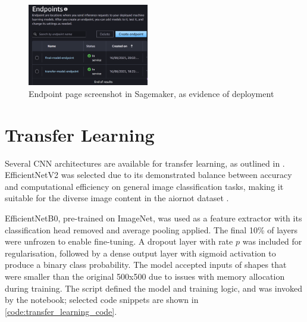 \begin{figure}[h]
    \centering
    \includegraphics[width=200px]{figures/endpoints_screenshot.png} %
    \centering
    \caption{Endpoint page screenshot in Sagemaker, as evidence of deployment} %
    \label{fig:endpoint} %
\end{figure}

\begin{figure}[h]
        
\end{figure}

\newpage

\section{Transfer Learning} \label{sec:transfer_learning}

Several CNN architectures are available for transfer learning, as outlined in \cite{keras_applications}. EfficientNetV2 was selected due to its demonstrated balance between accuracy and computational efficiency on general image classification tasks, making it suitable for the diverse image content in the aiornot dataset \cite{keras_applications, tan2021efficientnetv2}.

EfficientNetB0, pre-trained on ImageNet, was used as a feature extractor with its classification head removed and average pooling applied. The final 10\% of layers were unfrozen to enable fine-tuning. A dropout layer with rate $p$ was included for regularisation, followed by a dense output layer with sigmoid activation to produce a binary class probability. The model accepted inputs of shapes that were smaller than the original 500x500 due to issues with memory allocation during training. The  script defined the model and training logic, and was invoked by the  notebook; selected code snippets are shown in \cref{code:transfer_learning_code}.


\begin{figure}[h]
    
    \label{fig:transfer_learning_code}
\end{figure}

